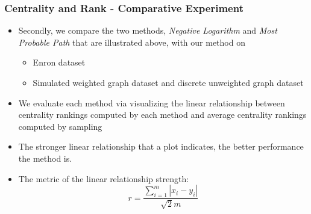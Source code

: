 \documentclass[9pt]{beamer}
\begin{document}

\begin{frame}
\frametitle{Centrality and Rank - Comparative Experiment}
\begin{itemize}
\item Secondly, we compare the two methods, \textit{Negative Logarithm} and \textit{Most Probable Path} that are illustrated above, with our method on 
\begin{itemize}
\item Enron dataset
\item Simulated weighted graph dataset and discrete unweighted graph dataset
\end{itemize}
\item We evaluate each method via visualizing the linear relationship between centrality rankings computed by each method and average centrality rankings computed by sampling
\item The stronger linear relationship that a plot indicates, the better performance the method is.
\item The metric of the linear relationship strength:
\[ r=\frac{\sum_{i=1}^{m}|x_i-y_i|}{\sqrt{2}m} \]
\end{itemize}
\end{frame}
\end{document}
